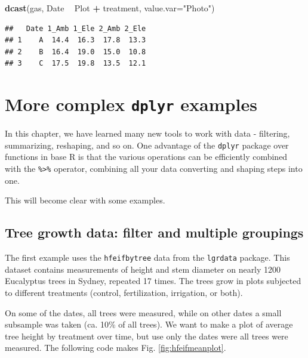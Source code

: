 \documentclass[]{book}
\newenvironment{Shaded}{\begin{snugshade}}{\end{snugshade}}
\newcommand{\DataTypeTok}[1]{\textcolor[rgb]{0.13,0.29,0.53}{#1}}
\newcommand{\KeywordTok}[1]{\textcolor[rgb]{0.13,0.29,0.53}{\textbf{#1}}}
\newcommand{\NormalTok}[1]{#1}
\newcommand{\OperatorTok}[1]{\textcolor[rgb]{0.81,0.36,0.00}{\textbf{#1}}}
\newcommand{\StringTok}[1]{\textcolor[rgb]{0.31,0.60,0.02}{#1}}
\begin{document}
\begin{Shaded}
\begin{Highlighting}[]
\KeywordTok{dcast}\NormalTok{(gas, Date }\OperatorTok{~}\StringTok{ }\NormalTok{Plot }\OperatorTok{+}\StringTok{ }\NormalTok{treatment, }\DataTypeTok{value.var=}\StringTok{"Photo"}\NormalTok{)}
\end{Highlighting}
\end{Shaded}

\begin{verbatim}
##   Date 1_Amb 1_Ele 2_Amb 2_Ele
## 1    A  14.4  16.3  17.8  13.3
## 2    B  16.4  19.0  15.0  10.8
## 3    C  17.5  19.8  13.5  12.1
\end{verbatim}

\hypertarget{more-complex-dplyr-examples}{%
\section{\texorpdfstring{More complex \texttt{dplyr} examples}{More complex dplyr examples}}\label{more-complex-dplyr-examples}}

In this chapter, we have learned many new tools to work with data - filtering, summarizing, reshaping, and so on. One advantage of the \texttt{dplyr} package over functions in base R is that the various operations can be efficiently combined with the \texttt{\%\textgreater{}\%} operator, combining all your data converting and shaping steps into one.

This will become clear with some examples.

\hypertarget{tree-growth-data-filter-and-multiple-groupings}{%
\subsection{Tree growth data: filter and multiple groupings}\label{tree-growth-data-filter-and-multiple-groupings}}

The first example uses the \texttt{hfeifbytree} data from the \texttt{lgrdata} package. This dataset contains measurements of height and stem diameter on nearly 1200 Eucalyptus trees in Sydney, repeated 17 times. The trees grow in plots subjected to different treatments (control, fertilization, irrigation, or both).

On some of the dates, all trees were measured, while on other dates a small subsample was taken (ca. 10\% of all trees). We want to make a plot of average tree height by treatment over time, but use only the dates were all trees were measured. The following code makes Fig. \ref{fig:hfeifmeanplot}.
\end{document}
